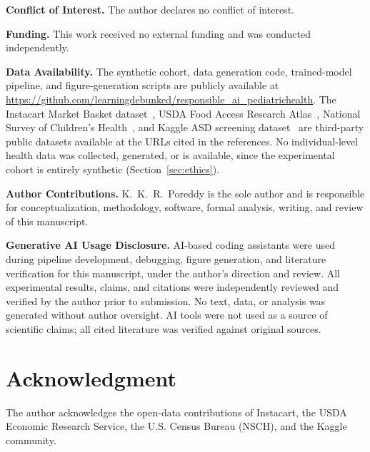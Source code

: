 \documentclass[journal]{IEEEtran}
\begin{document}
\textbf{Conflict of Interest.} The author declares no conflict of
interest.

\textbf{Funding.} This work received no external funding and was
conducted independently.

\textbf{Data Availability.} The synthetic cohort, data generation
code, trained-model pipeline, and figure-generation scripts are
publicly available at
\url{https://github.com/learningdebunked/responsible_ai_pediatrichealth}.
The Instacart Market Basket dataset~\cite{instacart2017}, USDA Food
Access Research Atlas~\cite{usdafara2019}, National Survey of
Children's Health~\cite{nsch2022}, and Kaggle ASD screening
dataset~\cite{thabtah2019autism} are third-party public datasets
available at the URLs cited in the references. No individual-level
health data was collected, generated, or is available, since the
experimental cohort is entirely synthetic (Section~\ref{sec:ethics}).

\textbf{Author Contributions.} K.~K.~R.~Poreddy is the sole author
and is responsible for conceptualization, methodology, software,
formal analysis, writing, and review of this manuscript.

\textbf{Generative AI Usage Disclosure.} AI-based coding assistants
were used during pipeline development, debugging, figure generation,
and literature verification for this manuscript, under the author's
direction and review. All experimental results, claims, and citations
were independently reviewed and verified by the author prior to
submission. No text, data, or analysis was generated without author
oversight. AI tools were not used as a source of scientific claims;
all cited literature was verified against original sources.

\section*{Acknowledgment}
The author acknowledges the open-data contributions of Instacart,
the USDA Economic Research Service, the U.S. Census Bureau (NSCH),
and the Kaggle community.



\end{document}
